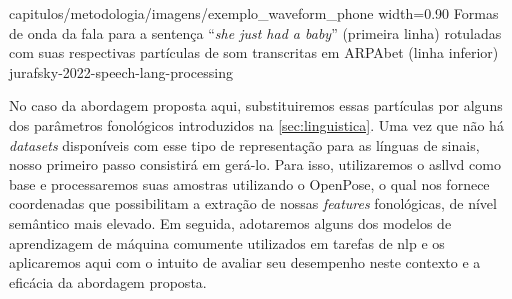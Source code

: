 {capitulos/metodologia/imagens/exemplo_waveform_phone}
{width=0.90\textwidth}
{Formas de onda da fala para a sentença ``\textit{she just had a baby}'' (primeira linha) rotuladas com suas respectivas partículas de som transcritas em ARPAbet (linha inferior)}
{jurafsky-2022-speech-lang-processing}






No caso da abordagem proposta aqui, substituiremos essas partículas por alguns dos parâmetros fonológicos introduzidos na \autoref{sec:linguistica}. Uma vez que não há \textit{datasets} disponíveis com esse tipo de representação para as línguas de sinais, nosso primeiro passo consistirá em gerá-lo. Para isso, utilizaremos o \acrshort{asllvd} como base e processaremos suas amostras utilizando o OpenPose, o qual nos fornece coordenadas que possibilitam a extração de nossas \textit{features} fonológicas, de nível semântico mais elevado.
Em seguida, adotaremos alguns dos modelos de aprendizagem de máquina comumente utilizados em tarefas de \acrshort{nlp} e os aplicaremos aqui com o intuito de avaliar seu desempenho neste contexto e a eficácia da abordagem proposta. 

